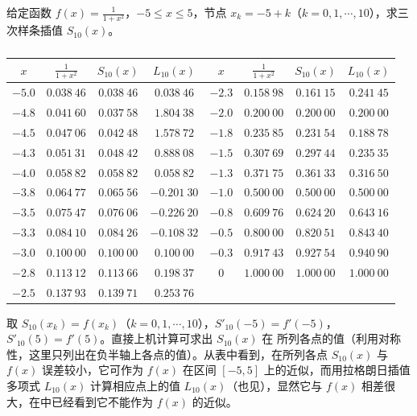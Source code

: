 \documentclass[../../main.tex]{subfiles}%
\begin{document}
\begin{example}
给定函数 $f(x)=\frac{1}{1+x^2}$，$-5\leqslant x\leqslant 5$，节点 $x_k=-5+k$（$k=0,1,\cdots,10$），求三次样条插值 $S_{10}(x)$。
\end{example}
\begin{solution}
\begin{table}[H]
\centering
\caption{}
\label{table:数值分析例题表格2-7}
\begin{tabular}{c c c c || c c c c}
\hline
$x$ & $\frac{1}{1+x^2}$ & $S_{10}(x)$ & $L_{10}(x)$ & $x$ & $\frac{1}{1+x^2}$ & $S_{10}(x)$ & $L_{10}(x)$ \\
\hline
$-5.0$ & $0.038\ 46$ & $0.038\ 46$ & $0.038\ 46$ & $-2.3$ & $0.158\ 98$ & $0.161\ 15$ & $0.241\ 45$ \\
$-4.8$ & $0.041\ 60$ & $0.037\ 58$ & $1.804\ 38$ & $-2.0$ & $0.200\ 00$ & $0.200\ 00$ & $0.200\ 00$ \\
$-4.5$ & $0.047\ 06$ & $0.042\ 48$ & $1.578\ 72$ & $-1.8$ & $0.235\ 85$ & $0.231\ 54$ & $0.188\ 78$ \\
$-4.3$ & $0.051\ 31$ & $0.048\ 42$ & $0.888\ 08$ & $-1.5$ & $0.307\ 69$ & $0.297\ 44$ & $0.235\ 35$ \\
$-4.0$ & $0.058\ 82$ & $0.058\ 82$ & $0.058\ 82$ & $-1.3$ & $0.371\ 75$ & $0.361\ 33$ & $0.316\ 50$ \\
$-3.8$ & $0.064\ 77$ & $0.065\ 56$ & $-0.201\ 30$ & $-1.0$ & $0.500\ 00$ & $0.500\ 00$ & $0.500\ 00$ \\
$-3.5$ & $0.075\ 47$ & $0.076\ 06$ & $-0.226\ 20$ & $-0.8$ & $0.609\ 76$ & $0.624\ 20$ & $0.643\ 16$ \\
$-3.3$ & $0.084\ 10$ & $0.084\ 26$ & $-0.108\ 32$ & $-0.5$ & $0.800\ 00$ & $0.820\ 51$ & $0.843\ 40$ \\
$-3.0$ & $0.100\ 00$ & $0.100\ 00$ & $0.100\ 00$ & $-0.3$ & $0.917\ 43$ & $0.927\ 54$ & $0.940\ 90$ \\
$-2.8$ & $0.113\ 12$ & $0.113\ 66$ & $0.198\ 37$ & $0$ & $1.000\ 00$ & $1.000\ 00$ & $1.000\ 00$ \\
$-2.5$ & $0.137\ 93$ & $0.139\ 71$ & $0.253\ 76$ &  &  &  &  \\
\hline
\end{tabular}
\end{table}
取 $S_{10}(x_k)=f(x_k)$（$k=0,1,\cdots,10$），$S'_{10}(-5)=f'(-5)$，$S'_{10}(5)=f'(5)$。直接上机计算可求出 $S_{10}(x)$ 在 所列各点的值（利用对称性，这里只列出在负半轴上各点的值）。从表中看到，在所列各点 $S_{10}(x)$ 与 $f(x)$ 误差较小，它可作为 $f(x)$ 在区间 $[-5,5]$ 上的近似，而用拉格朗日插值多项式 $L_{10}(x)$ 计算相应点上的值 $L_{10}(x)$（也见），显然它与 $f(x)$ 相差很大，在中已经看到它不能作为 $f(x)$ 的近似。

\end{solution}
\end{document}
